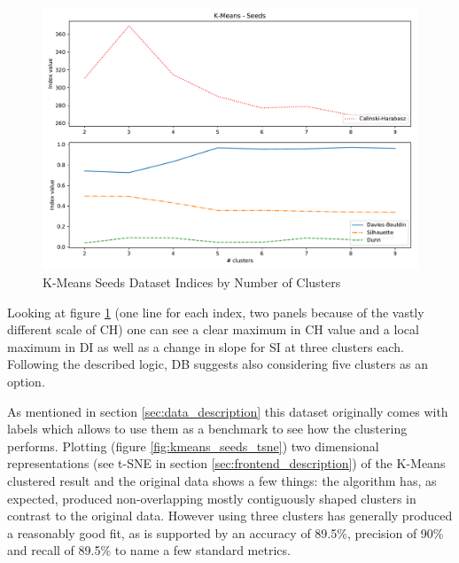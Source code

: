 \begin{figure}[H]
\caption{K-Means Seeds Dataset Indices by Number of Clusters}
\begin{center}
\includegraphics[width=1.0\textwidth]{images/kmeans_seeds_index_plot.pdf}
\end{center}
\label{fig:kmeans_seeds_comparison_plot}
\end{figure}

Looking at figure \ref{fig:kmeans_seeds_comparison_plot} (one line for each index, two panels because of the vastly different scale of \gls{CH}) one can see a clear maximum in \gls{CH} value and a local maximum in \gls{DI} as well as a change in slope for \gls{SI} at three clusters each. Following the described logic, \gls{DB} suggests also considering five clusters as an option. 

As mentioned in section \ref{sec:data_description} this dataset originally comes with labels which allows to use them as a benchmark to see how the clustering performs. Plotting (figure \ref{fig:kmeans_seeds_tsne}) two dimensional representations (see t-SNE in section \ref{sec:frontend_description}) of the K-Means clustered result and the original data shows a few things: the algorithm has, as expected, produced non-overlapping mostly contiguously shaped clusters in contrast to the original data. However using three clusters has generally produced a reasonably good fit, as is supported by an accuracy of 89.5\%, precision of 90\% and recall of 89.5\% to name a few standard metrics.

